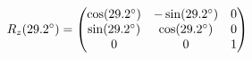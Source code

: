\documentclass[preview]{standalone}
\begin{document}
\begin{align*}
\special{dvisvgm:raw <g id='unique000'>}R_z(29.2^\circ) = \begin{pmatrix} \cos(29.2^\circ) & -\sin(29.2^\circ) & 0 \\ \sin(29.2^\circ) & \cos(29.2^\circ) & 0 \\ 0 & 0 & 1 \end{pmatrix}\special{dvisvgm:raw </g>}
\end{align*}
\end{document}
